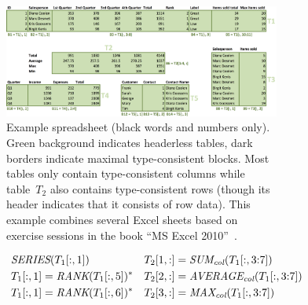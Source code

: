 \begin{figure}[thb]

  \begin{subfigure}{1\textwidth}
  \begin{center}
    \includegraphics[width=1\textwidth]{figures/Demo2.png}
  \end{center}
  \vspace{-10pt}
  \caption{
    Example spreadsheet (black words and numbers only).
    Green background indicates headerless tables, dark borders indicate maximal type-consistent blocks.
    Most tables only contain type-consistent columns while table~$T_2$ also contains type-consistent rows (though its header indicates that it consists of row data).
    This example combines several Excel sheets based on exercise sessions in the book ``MS Excel 2010''~\cite{excel_book}.
  }
  \label{fig:main_example}
\end{subfigure}
\hfill
\begin{subfigure}{1\textwidth}
  {\scriptsize
    \begin{align*}
%
%
      &~\ecseries{\range{T_{1}}{\rangeall}{1}}                                  && \ecsumc{\range{T_{2}}{1}{\rangeall}}{\range{T_{1}}{\rangeall}{\rangeto{3}{7}}} \\
      &~\ecrank{\range{T_{1}}{\rangeall}{1}}{\range{T_{1}}{\rangeall}{5}}^*     && \ecaggc{\textit{AVERAGE}}{\range{T_{2}}{2}{\rangeall}}{\range{T_{1}}{\rangeall}{\rangeto{3}{7}}}  \\
      &~\ecrank{\range{T_{1}}{\rangeall}{1}}{\range{T_{1}}{\rangeall}{6}}^*     && \ecaggc{\textit{MAX}}{\range{T_{2}}{3}{\rangeall}}{\range{T_{1}}{\rangeall}{\rangeto{3}{7}}} \\

\end{align*}}
\end{subfigure}
\end{figure}
